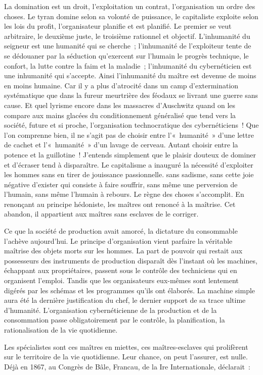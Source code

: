 \documentclass[french,twoside]{book} %
\begin{document}
La domination est un droit, l’exploitation un contrat, l’organisation un ordre des choses. Le tyran domine selon sa volonté de puissance, le capitaliste exploite selon les lois du profit, l’organisateur planifie et est planifié. Le premier se veut arbitraire, le deuxième juste, le troisième rationnel et objectif. L’inhumanité du seigneur est une humanité qui se cherche ; l’inhumanité de l’exploiteur tente de se dédouaner par la séduction qu’exercent sur l’humain le progrès technique, le confort, la lutte contre la faim et la maladie ; l’inhumanité du cybernéticien est une inhumanité qui s’accepte. Ainsi l’inhumanité du maître est devenue de moins en moins humaine. Car il y a plus d’atrocité dans un camp d’extermination systématique que dans la fureur meurtrière des féodaux se livrant une guerre sans cause. Et quel lyrisme encore dans les massacres d’Auschwitz quand on les compare aux mains glacées du conditionnement généralisé que tend vers la société, future et si proche, l’organisation technocratique des cybernéticiens ! Que l’on comprenne bien, il ne s’agit pas de choisir entre l’« humanité » d’une lettre de cachet et l’« humanité » d’un lavage de cerveau. Autant choisir entre la potence et la guillotine ! J’entends simplement que le plaisir douteux de dominer et d’écraser tend à disparaître. Le capitalisme a inauguré la nécessité d’exploiter les hommes sans en tirer de jouissance passionnelle. sans sadisme, sans cette joie négative d’exister qui consiste à faire souffrir, sans même une perversion de l’humain, sans même l’humain à rebours. Le règne des choses s’accomplit. En renonçant au principe hédoniste, les maîtres ont renoncé à la maîtrise. Cet abandon, il appartient aux maîtres sans esclaves de le corriger.\par
Ce que la société de production avait amorcé, la dictature du consommable l’achève aujourd’hui. Le principe d’organisation vient parfaire la véritable maîtrise des objets morts sur les hommes. La part de pouvoir qui restait aux possesseurs des instruments de production disparaît dès l’instant où les machines, échappant aux propriétaires, passent sous le contrôle des techniciens qui en organisent l’emploi. Tandis que les organisateurs eux-mêmes sont lentement digérés par les schémas et les programmes qu’ils ont élaborés. La machine simple aura été la dernière justification du chef, le dernier support de sa trace ultime d’humanité. L’organisation cybernéticienne de la production et de la consommation passe obligatoirement par le contrôle, la planification, la rationalisation de la vie quotidienne.\par
Les spécialistes sont ces maîtres en miettes, ces maîtres-esclaves qui prolifèrent sur le territoire de la vie quotidienne. Leur chance, on peut l’assurer, est nulle. Déjà en 1867, au Congrès de Bâle, Francau, de la Ire Internationale, déclarait :\par
\end{document}
